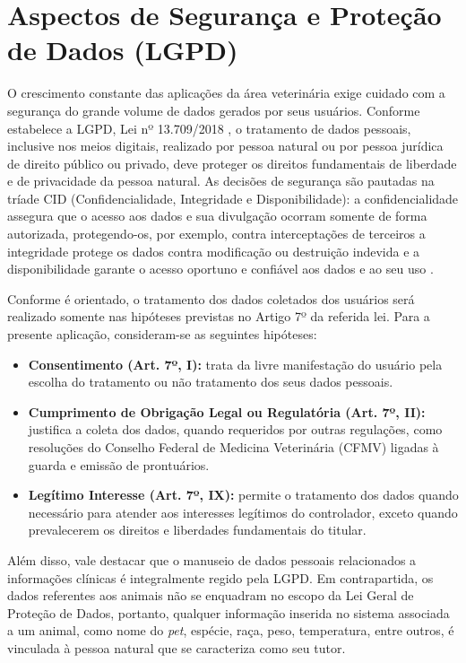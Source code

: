 \section{Aspectos de Segurança e Proteção de Dados (LGPD)}
O crescimento constante das aplicações da área veterinária exige cuidado com a segurança do grande volume de dados gerados por seus usuários. Conforme estabelece a LGPD, Lei nº 13.709/2018 \cite{lgpd2018}, o tratamento de dados pessoais, inclusive nos meios digitais, realizado por pessoa natural ou por pessoa jurídica de direito público ou privado, deve proteger os direitos fundamentais de liberdade e de privacidade da pessoa natural. As decisões de segurança são pautadas na tríade CID (Confidencialidade, Integridade e Disponibilidade): a confidencialidade assegura que o acesso aos dados e sua divulgação ocorram somente de forma autorizada, protegendo-os, por exemplo, contra interceptações de terceiros a integridade protege os dados contra modificação ou destruição indevida e a disponibilidade garante o acesso oportuno e confiável aos dados e ao seu uso \cite[p.~2--3]{nist2017}.

Conforme é orientado, o tratamento dos dados coletados dos usuários será realizado somente nas hipóteses previstas no Artigo 7º da referida lei. Para a presente aplicação, consideram-se as seguintes hipóteses:

\begin{itemize}
     \renewcommand\labelitemi{-}
		\item \textbf{Consentimento (Art. 7º, I):} trata da livre manifestação do usuário pela escolha do tratamento ou não tratamento dos seus dados pessoais.
		\item \textbf{Cumprimento de Obrigação Legal ou Regulatória (Art. 7º, II):} justifica a coleta dos dados, quando requeridos por outras regulações, como resoluções do Conselho Federal de Medicina Veterinária (CFMV) ligadas à guarda e emissão de prontuários.
        \item \textbf{Legítimo Interesse (Art. 7º, IX):} permite o tratamento dos dados quando necessário para atender aos interesses legítimos do controlador, exceto quando prevalecerem os direitos e liberdades fundamentais do titular.
	\end{itemize}

Além disso, vale destacar que o manuseio de dados pessoais relacionados a informações clínicas é integralmente regido pela LGPD. Em contrapartida, os dados referentes aos animais não se enquadram no escopo da Lei Geral de Proteção de Dados, portanto, qualquer informação inserida no sistema associada a um animal, como nome do \textit{pet}, espécie, raça, peso, temperatura, entre outros, é vinculada à pessoa natural que se caracteriza como seu tutor.